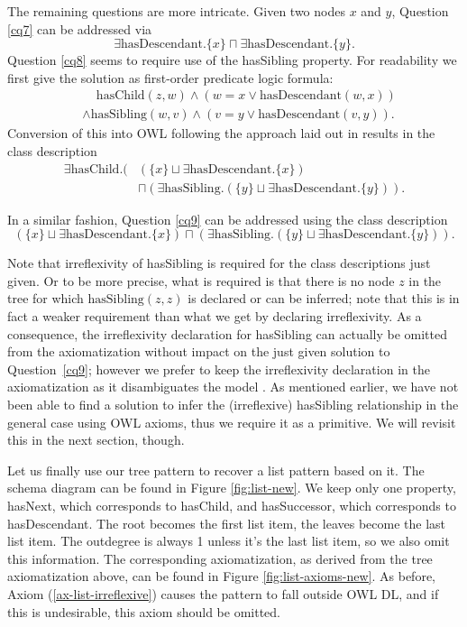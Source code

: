 The remaining questions are more intricate. Given two nodes $x$ and $y$, Question \ref{cq7} can be addressed via
$$\exists\text{hasDescendant}.\{x\} \sqcap \exists\text{hasDescendant}.\{y\}.$$
Question \ref{cq8} seems to require use of the hasSibling property. For readability we first give the solution as first-order predicate logic formula: 
\begin{align*}
&\phantom{\wedge} \text{hasChild}(z,w) \wedge (w=x \vee \text{hasDescendant}(w,x))\\ &\wedge \text{hasSibling}(w,v) \wedge (v=y \vee \text{hasDescendant}(v,y)).
\end{align*}
Conversion of this into OWL following the approach laid out in \cite{KrisnadhiMH11} results in the class description 
\begin{align*}
\exists\text{hasChild}.(&(\{x\}\sqcup\exists\text{hasDescendant}.\{x\})\\
&\sqcap (\exists\text{hasSibling}.(\{y\}\sqcup\exists\text{hasDescendant}.\{y\})).
\end{align*}

In a similar fashion, Question \ref{cq9} can be addressed using the class description 
$$(\{x\}\sqcup\exists\text{hasDescendant}.\{x\})\sqcap (\exists\text{hasSibling}.(\{y\}\sqcup\exists\text{hasDescendant}.\{y\})).$$

Note that irreflexivity of hasSibling is required for the class descriptions just given. Or to be more precise, what is required is that there is no node $z$ in the tree for which $\text{hasSibling}(z,z)$ is declared or can be inferred; note that this is in fact a weaker requirement than what we get by declaring irreflexivity. As a consequence, the irreflexivity declaration for hasSibling can actually be omitted from the axiomatization without impact on the just given solution to Question~\ref{cq9}; however we prefer to keep the irreflexivity declaration in the axiomatization as it disambiguates the model \cite{HitzlerK16}.   As mentioned earlier, we have not been able to find a solution to infer the (irreflexive) hasSibling relationship in the general case using OWL axioms, thus we require it as a primitive. We will revisit this in the next section, though.

Let us finally use our tree pattern to recover a list pattern based on it. The schema diagram can be found in Figure \ref{fig:list-new}. We keep only one property, hasNext, which corresponds to hasChild, and hasSuccessor, which corresponds to hasDescendant. The root becomes the first list item, the leaves become the last list item. The outdegree is always 1 unless it's the last list item, so we also omit this information. The corresponding axiomatization, as derived from the tree axiomatization above, can be found in Figure \ref{fig:list-axioms-new}. As before, Axiom (\ref{ax-list-irreflexive}) causes the pattern to fall outside OWL DL, and if this is undesirable, this axiom should be omitted.

